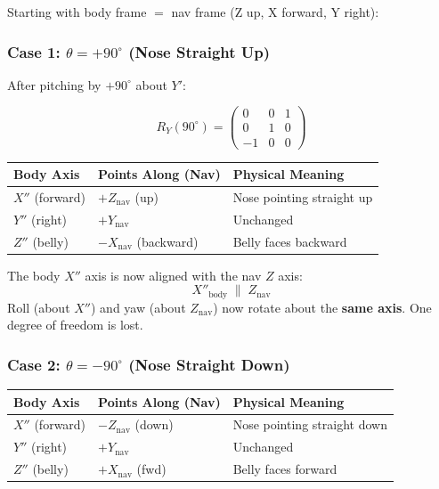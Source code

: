\documentclass[12pt,a4paper]{article}
\begin{document}
Starting with body frame $=$ nav frame (Z up, X forward, Y right):

\subsubsection*{Case 1: $\theta = +90^\circ$ (Nose Straight Up)}

After pitching by $+90^\circ$ about $Y'$:

\[
R_Y(90^\circ) = \begin{pmatrix} 0 & 0 & 1 \\ 0 & 1 & 0 \\ -1 & 0 & 0 \end{pmatrix}
\]

\begin{table}[h]
\centering
\begin{tabular}{@{}lll@{}}
\toprule
\textbf{Body Axis} & \textbf{Points Along (Nav)} & \textbf{Physical Meaning} \\
\midrule
$X''$ (forward) & $+Z_{\text{nav}}$ (up)       & Nose pointing straight up \\
$Y''$ (right)   & $+Y_{\text{nav}}$            & Unchanged \\
$Z''$ (belly)   & $-X_{\text{nav}}$ (backward) & Belly faces backward \\
\bottomrule
\end{tabular}
\end{table}

\begin{warningbox}
The body $X''$ axis is now aligned with the nav $Z$ axis:
\[
  X''_{\text{body}} \;\|\; Z_{\text{nav}}
\]
Roll (about $X''$) and yaw (about $Z_{\text{nav}}$) now rotate about the
\textbf{same axis}. One degree of freedom is lost.
\end{warningbox}

\subsubsection*{Case 2: $\theta = -90^\circ$ (Nose Straight Down)}

\begin{table}[h]
\centering
\begin{tabular}{@{}lll@{}}
\toprule
\textbf{Body Axis} & \textbf{Points Along (Nav)} & \textbf{Physical Meaning} \\
\midrule
$X''$ (forward) & $-Z_{\text{nav}}$ (down) & Nose pointing straight down \\
$Y''$ (right)   & $+Y_{\text{nav}}$        & Unchanged \\
$Z''$ (belly)   & $+X_{\text{nav}}$ (fwd)  & Belly faces forward \\
\bottomrule
\end{tabular}
\end{table}
\end{document}
